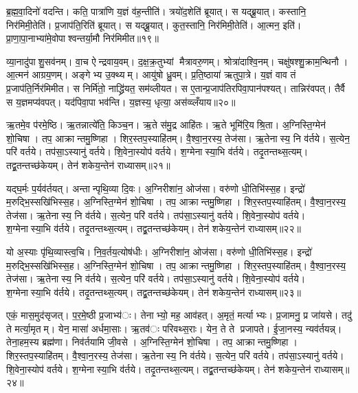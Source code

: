 
ब्र॒ह्म॒वा॒दिनो॑ वदन्ति। कति॒ पात्रा॑णि य॒ज्ञं व॑ह॒न्तीति॑। त्रयो॑द॒शेति॑ ब्रूयात्। स यद्ब्रू॒यात्। कस्तानि॒ निर॑मिमी॒तेति॑। प्र॒जाप॑ति॒रिति॑ ब्रूयात्। स यद्ब्रू॒यात्। कुत॒स्तानि॒ निर॑मिमी॒तेति॑। आ॒त्मन॒ इति॑। प्रा॒णा॒पा॒नाभ्या॑मे॒वोपाश्वन्तर्या॒मौ निर॑मिमीत॥१९॥

व्या॒नादु॑पाशु॒सव॑नम्। वा॒च ऐन्द्रवाय॒वम्। द॒क्ष॒क्र॒तुभ्यां मैत्रावरु॒णम्। श्रोत्रा॑दाश्वि॒नम्। चक्षु॑षश्शु॒क्राम॒न्थिनौ। आ॒त्मन॑ आग्रय॒णम्। अङ्गेभ्य उ॒क्थ्यम्। आयु॑षो ध्रु॒वम्। प्र॒ति॒ष्ठाया॑ ऋतुपा॒त्रे। य॒ज्ञं वाव तं प्र॒जाप॑ति॒र्निर॑मिमीत। स निर्मि॑तो॒ नाद्ध्रि॑यत॒ सम॑व्लीयत। स ए॒तान्प्र॒जाप॑तिरपिवा॒पान॑पश्यत्। तान्निर॑वपत्। तैर्वै स य॒ज्ञमप्य॑वपत्। यद॑पिवा॒पा भव॑न्ति। य॒ज्ञस्य॒ धृत्या॒ अस॑व्व्लँयाय॥२०॥


ऋ॒तमे॒व प॑रमे॒ष्ठि। ऋ॒तन्नात्ये॑ति॒ किञ्च॒न। ऋ॒ते स॑मु॒द्र आहि॑तः। ऋ॒ते भूमि॑रि॒यश्रि॒ता। अ॒ग्निस्ति॒ग्मेन॑ शो॒चिषा। तप॒ आक्रान्तमु॒ष्णिहा। शिर॒स्तप॒स्याहि॑तम्। वै॒श्वा॒न॒रस्य॒ तेज॑सा। ऋ॒तेनास्य॒ नि व॑र्तये। स॒त्येन॒ परि॑ वर्तये। तप॑सा॒ऽस्यानु॑ वर्तये। शि॒वेना॒स्योप॑ वर्तये। श॒ग्मेनास्या॒भि व॑र्तये। तदृ॒तन्तथ्स॒त्यम्। तद्व्र॒तन्तच्छ॑केयम्। तेन॑ शकेय॒न्तेन॑ राध्यासम्॥२१॥

यद्घ॒र्मः प॒र्यव॑र्तयत्। अन्तान्पृथि॒व्या दि॒वः। अ॒ग्निरीशा॑न॒ ओज॑सा। वरु॑णो धी॒तिभि॑स्स॒ह। इन्द्रो॑ म॒रुद्भि॒स्सखि॑भिस्स॒ह। अ॒ग्निस्ति॒ग्मेन॑ शो॒चिषा। तप॒ आक्रान्तमु॒ष्णिहा। शिर॒स्तप॒स्याहि॑तम्। वै॒श्वा॒न॒रस्य॒ तेज॑सा। ऋ॒तेनास्य॒ नि व॑र्तये। स॒त्येन॒ परि॑ वर्तये। तप॑सा॒ऽस्यानु॑ वर्तये। शि॒वेना॒स्योप॑ वर्तये। श॒ग्मेनास्या॒भि व॑र्तये। तदृ॒तन्तथ्स॒त्यम्। तद्व्र॒तन्तच्छ॑केयम्। तेन॑ शकेय॒न्तेन॑ राध्यासम्॥२२॥

यो अ॒स्याः पृ॑थि॒व्यास्त्व॒चि। नि॒व॒र्तय॒त्योष॑धीः। अ॒ग्निरीशा॑न॒ ओज॑सा। वरु॑णो धी॒तिभि॑स्स॒ह। इन्द्रो॑ म॒रुद्भि॒स्सखि॑भिस्स॒ह। अ॒ग्निस्ति॒ग्मेन॑ शो॒चिषा। तप॒ आक्रान्तमु॒ष्णिहा। शिर॒स्तप॒स्याहि॑तम्। वै॒श्वा॒न॒रस्य॒ तेज॑सा। ऋ॒तेनास्य॒ नि व॑र्तये। स॒त्येन॒ परि॑ वर्तये। तप॑सा॒ऽस्यानु॑ वर्तये। शि॒वेना॒स्योप॑ वर्तये। श॒ग्मेनास्या॒भि व॑र्तये। तदृ॒तन्तथ्स॒त्यम्। तद्व्र॒तन्तच्छ॑केयम्। तेन॑ शकेय॒न्तेन॑ राध्यासम्॥२३॥

एकं॒ मास॒मुद॑सृजत्। प॒र॒मे॒ष्ठी प्र॒जाभ्य॑ः। तेनाभ्यो॒ मह॒ आव॑हत्। अ॒मृतं॒ मर्त्याभ्यः। प्र॒जामनु॒ प्र जा॑यसे। तदु॑ ते मर्त्या॒मृतम्। येन॒ मासा॑ अर्धमा॒साः। ऋ॒तव॑ः परिवथ्स॒राः। येन॒ ते ते प्रजापते। ई॒जा॒नस्य॒ न्यव॑र्तयन्न्। तेना॒हम॒स्य ब्रह्म॑णा। निव॑र्तयामि जी॒वसे। अ॒ग्निस्ति॒ग्मेन॑ शो॒चिषा। तप॒ आक्रान्तमु॒ष्णिहा। शिर॒स्तप॒स्याहि॑तम्। वै॒श्वा॒न॒रस्य॒ तेज॑सा। ऋ॒तेनास्य॒ नि व॑र्तये। स॒त्येन॒ परि॑ वर्तये। तप॑सा॒ऽस्यानु॑ वर्तये। शि॒वेना॒स्योप॑ वर्तये। श॒ग्मेनास्या॒भि व॑र्तये। तदृ॒तन्तथ्स॒त्यम्। तद्व्र॒तन्तच्छ॑केयम्। तेन॑ शकेय॒न्तेन॑ राध्यासम्॥२४॥

